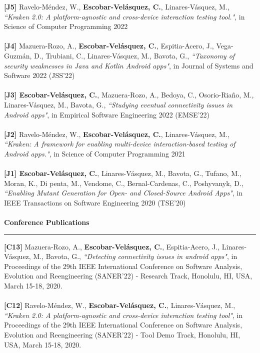 \documentclass[letterpaper,11pt,oneside]{article}
\begin{document}
\noindent \textbf{[J5]} Ravelo-Méndez, W., \textbf{Escobar-Velásquez, C.},  Linares-Vásquez, M., \textit{``Kraken 2.0: A platform-agnostic and cross-device interaction testing tool."}, in Science of Computer Programming 2022\\
\\
\noindent \textbf{[J4]} Mazuera-Rozo, A., \textbf{Escobar-Velásquez, C.}, Espitia-Acero, J., Vega-Guzm\'an, D., Trubiani, C., Linares-V\'asquez, M., Bavota, G., \textit{``Taxonomy of security weaknesses in Java and Kotlin Android apps"}, in Journal of Systems and Software 2022 (JSS'22)\\
\\
\noindent \textbf{[J3] Escobar-Velásquez, C.}, Mazuera-Rozo, A., Bedoya, C., Osorio-Riaño, M., Linares-Vásquez, M., Bavota, G., \textit{``Studying eventual connectivity issues in Android apps"}, in Empirical Software Engineering 2022 (EMSE'22)\\
\\
\noindent \textbf{[J2]} Ravelo-Méndez, W., \textbf{Escobar-Velásquez, C.},  Linares-Vásquez, M., \textit{``Kraken: A framework for enabling multi-device interaction-based testing of Android apps."}, in Science of Computer Programming 2021\\
\\
\noindent \textbf{[J1] Escobar-Velásquez, C.}, Linares-V\'asquez, M., Bavota, G., Tufano, M., Moran, K., Di penta, M., Vendome, C., Bernal-Cardenas, C., Poshyvanyk, D., \textit{``Enabling Mutant Generation for Open- and Closed-Source Android Apps"}, in IEEE Transactions on Software Engineering 2020 (TSE’20)\\
\\
\noindent \Large{\textbf{Conference Publications}} \\
\vspace{-2ex}
\hrule 
\normalsize
\vspace{2ex}
\noindent \textbf{[C13]} Mazuera-Rozo, A., \textbf{Escobar-Velásquez, C.}, Espitia-Acero, J., Linares-V\'asquez, M., Bavota, G., \textit{``Detecting connectivity issues in android apps"}, in Proceedings of the 29th IEEE International Conference on Software Analysis, Evolution and Reengineering (SANER'22) - Research Track, Honolulu, HI, USA, March 15-18, 2020. \\
\\
\noindent \textbf{[C12]} Ravelo-Méndez, W., \textbf{Escobar-Velásquez, C.},  Linares-Vásquez, M., \textit{``Kraken 2.0: A platform-agnostic and cross-device interaction testing tool"}, in Proceedings of the 29th IEEE International Conference on Software Analysis, Evolution and Reengineering (SANER'22) - Tool Demo Track, Honolulu, HI, USA, March 15-18, 2020. \\
\end{document}
